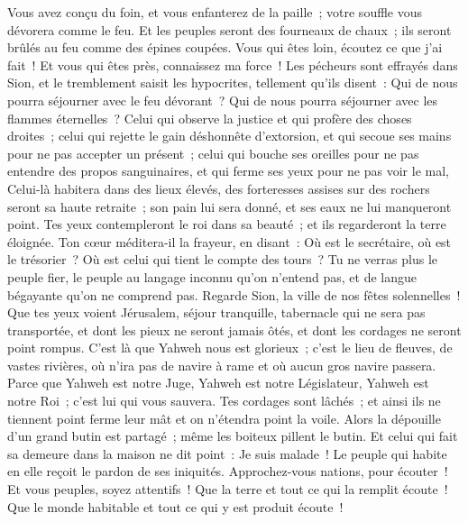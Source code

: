 \begin{multicols}{2}
Vous avez conçu du foin, et vous enfanterez de la paille~; votre souffle vous dévorera comme le feu.
Et les peuples seront des fourneaux de chaux~; ils seront brûlés au feu comme des épines coupées.
Vous qui êtes loin, écoutez ce que j'ai fait~! Et vous qui êtes près, connaissez ma force~!
Les pécheurs sont effrayés dans Sion, et le tremblement saisit les hypocrites, tellement qu'ils disent~: Qui de nous pourra séjourner avec le feu dévorant~? Qui de nous pourra séjourner avec les flammes éternelles~?
Celui qui observe la justice et qui profère des choses droites~; celui qui rejette le gain déshonnête d'extorsion, et qui secoue ses mains pour ne pas accepter un présent~; celui qui bouche ses oreilles pour ne pas entendre des propos sanguinaires, et qui ferme ses yeux pour ne pas voir le mal,
Celui-là habitera dans des lieux élevés, des forteresses assises sur des rochers seront sa haute retraite~; son pain lui sera donné, et ses eaux ne lui manqueront point.
Tes yeux contempleront le roi dans sa beauté~; et ils regarderont la terre éloignée.
Ton cœur méditera-il la frayeur, en disant~: Où est le secrétaire, où est le trésorier~? Où est celui qui tient le compte des tours~?
Tu ne verras plus le peuple fier, le peuple au langage inconnu qu'on n'entend pas, et de langue bégayante qu'on ne comprend pas.
Regarde Sion, la ville de nos fêtes solennelles~! Que tes yeux voient Jérusalem, séjour tranquille, tabernacle qui ne sera pas transportée, et dont les pieux ne seront jamais ôtés, et dont les cordages ne seront point rompus.
C'est là que Yahweh nous est glorieux~; c'est le lieu de fleuves, de vastes rivières, où n'ira pas de navire à rame et où aucun gros navire passera.
Parce que Yahweh est notre Juge, Yahweh est notre Législateur, Yahweh est notre Roi~; c'est lui qui vous sauvera.
Tes cordages sont lâchés~; et ainsi ils ne tiennent point ferme leur mât et on n'étendra point la voile. Alors la dépouille d'un grand butin est partagé~; même les boiteux pillent le butin.
Et celui qui fait sa demeure dans la maison ne dit point~: Je suis malade~! Le peuple qui habite en elle reçoit le pardon de ses iniquités.
\VerseOne{}Approchez-vous nations, pour écouter~! Et vous peuples, soyez attentifs~! Que la terre et tout ce qui la remplit écoute~! Que le monde habitable et tout ce qui y est produit écoute~!

\end{multicols}
